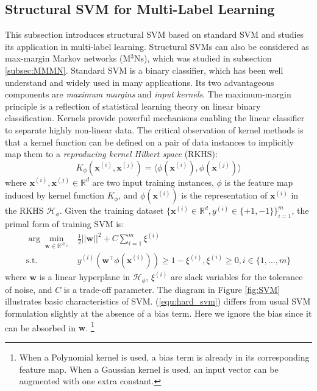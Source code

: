 \subsection{Structural SVM for Multi-Label Learning}
\label{subsec:SSVM}
This subsection introduces structural SVM \citep{StructSVM} based on standard SVM and studies its application 
in multi-label learning. Structural SVMs can also be considered as max-margin Markov networks (M$^3$Ns), which was studied in subsection \ref{subsec:MMMN}. 
Standard SVM is a binary classifier, which has been well 
understand and widely used in many applications.  
Its two advantageous components are \emph{maximum margins} and \emph{input kernels}. 
The maximum-margin principle is a reflection of statistical learning theory \citep{Vapnik} on 
linear binary classification. 
Kernels provide powerful mechanisms enabling the linear classifier to separate highly non-linear data. 
The critical observation of kernel methods is that a kernel function can be defined on a pair of data 
instances to implicitly map them to a \emph{reproducing kernel Hilbert space} (RKHS):   
\begin{equation}
    K_\phi(\mathbf{x}^{(i)},\mathbf{x}^{(j)})=\langle \phi(\mathbf{x}^{(i)}),\phi(\mathbf{x}^{(j)}) \rangle
 \label{equ:kernel_trick}
\end{equation}
where $\mathbf{x}^{(i)}, \mathbf{x}^{(j)}\in\mathbb{R}^d$ are two input training instances, $\phi$ is the feature map induced by kernel function $K_\phi$, and $\phi(\mathbf{x}^{(i)})$ is the 
representation of 
$\mathbf{x}^{(i)}$ in the RKHS $\mathcal{H}_\phi$.
Given the training dataset $\{\mathbf{x}^{(i)}\in\mathbb{R}^d,y^{(i)}\in\{+1,-1\}\}_{i=1}^m$, the primal form of training SVM is:
\begin{equation}
\begin{array}{rl} 
    \displaystyle \arg\min_{ \mathbf{w} \in \mathbb{R}^{\mathcal{H_{\phi}}}}   & \frac{1}{2} ||\mathbf{w}||^2+C\sum_{i=1}^m \xi^{(i)} \\
    \text{s.t.} & y^{(i)} \left(\mathbf{w}^\top \phi (\mathbf{x}^{(i)})\right) \geq 1-\xi^{(i)}, \xi^{(i)} \geq 0,  i\in \{1,\dots,m\}
\end{array}
\label{equ:hard_svm}
\end{equation}
where $\mathbf{w}$ is a linear hyperplane in $\mathcal{H}_\phi$, $\xi^{(i)}$ are slack variables for the tolerance of noise, and $C$ is a trade-off parameter. 
The diagram in Figure \ref{fig:SVM} illustrates basic characteristics of SVM.   
(\ref{equ:hard_svm}) differs from usual SVM formulation slightly at the absence of a bias term. Here we ignore the bias since 
it can be absorbed in $\mathbf{w}$. 
\footnote{When a Polynomial kernel is used, a bias term is already in its corresponding feature map. When a Gaussian kernel is used, an input vector can be 
augmented with one extra constant.}


